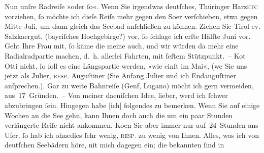 \pstart
           Nun unſre Radreiſe »oder ſo«. Wenn Sie irgendwas deutſches, Thüringer Harz\textsc{etc} vorziehen, ſo möchte ich dieſe Reiſe mehr gegen den
                  So{\geminationm}er verſchieben, etwa gegen Mitte Juli, um dann gleich das Seebad an{\pb}ſchließen zu
               können. Ziehen Sie Tirol ev. Salzka{\geminationm}ergut, (bayriſches Hochgebirge?) vor, ſo ſchlage ich erſte
               Hälfte Juni vor. Geht Ihre Frau mit, ſo käme die meine auch, und wir würden da{\geminationn} mehr eine Radialradpartie machen, d. h. allerlei
               Fahrten, mit feſtem Stützpunkt. – Ko{\geminationm}t Otti nicht, ſo ſoll es eine Längspartie werden, »wie einſt im
               Mai«, (we{\geminationn} Sie uns jetzt als Julier, \textsc{resp.} Auguſtiner (Sie \introOben{}Anfang\introOben{} Julier
               und ich Endauguſtiner anſprechen.). Gar zu weite Bahnreiſe (Genf, Lugano) möcht ich
               gern vermeiden, {\pb}aus 17 Gründen. – Von meiner
                  daeniſchen Idee, lieber,
               werd ich ſchwer abzubringen ſein. Hingegen habe {[}ich{]} folgendes zu
               bemerken. Wenn Sie auf einige Wochen an die See gehn, kann Ihnen doch auch die um ein paar Stunden
               verlängerte Reiſe nicht ankommen. Ko{\geminationm}en Sie aber immer
               nur auf 24 Stunden ans Ufer, ſo hab ich ohnedies ſehr wenig, \textsc{resp\textcolor{gray}{.}} zu wenig von Ihnen. Alles, was ich von deutſchen Seebädern höre, ni{\geminationm}t
               mich dagegen ein; die bekannten {\pb}ſind in
